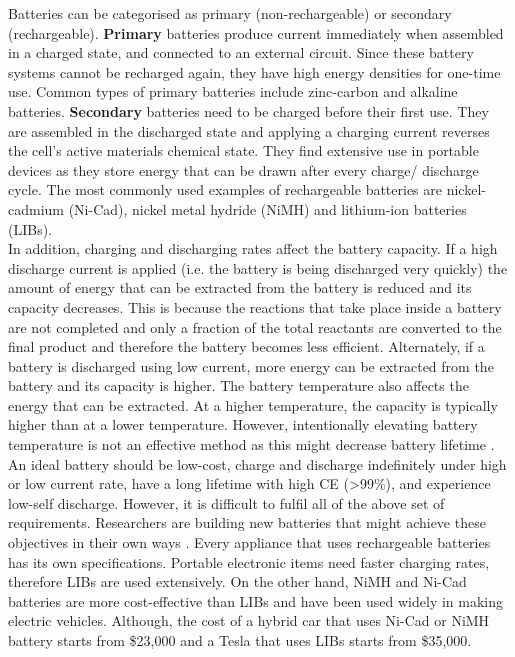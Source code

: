 Batteries can be categorised as primary (non-rechargeable) or secondary (rechargeable). \textbf{Primary} batteries produce current immediately when assembled in a charged state, and connected to an external circuit. Since these battery systems cannot be recharged again, they have high energy densities for one-time use. Common types of primary batteries include zinc-carbon and alkaline batteries. 
\textbf{Secondary} batteries need to be charged before their first use. They are assembled in the discharged state and applying a charging current reverses the cell's active materials chemical state. They find extensive use in portable devices as they store energy that can be drawn after every charge/ discharge cycle. The most commonly used examples of rechargeable batteries are nickel-cadmium (Ni-Cad), nickel metal hydride (NiMH) and lithium-ion batteries (LIBs). \\  
In addition, charging and discharging rates affect the battery capacity. If a high discharge current is applied (i.e. the battery is being discharged very quickly) the amount of energy that can be extracted from the battery is reduced and its capacity decreases. This is because the reactions that take place inside a battery are not completed and only a fraction of the total reactants are converted to the final product and therefore the battery becomes less efficient. Alternately, if a battery is discharged using low current, more energy can be extracted from the battery and its capacity is higher. The battery temperature also affects the energy that can be extracted. At a higher temperature, the capacity is typically higher than at a lower temperature. However, intentionally elevating battery temperature is not an effective method as this might decrease battery lifetime \cite{leng_effect_2015, ma_temperature_2018}. 
An ideal battery should be low-cost, charge and discharge indefinitely under high or low current rate, have a long lifetime with high CE (>99\%), and experience low-self discharge. However, it is difficult to fulfil all of the above set of requirements. Researchers are building new batteries that might achieve these objectives in their own ways \cite{slater_sodium-ion_2013, jian_carbon_2015, aurbach_prototype_2000, lin_ultrafast_2015}. Every appliance that uses rechargeable batteries has its own specifications. Portable electronic items need faster charging rates, therefore LIBs are used extensively. On the other hand, NiMH and Ni-Cad batteries are more cost-effective than LIBs and have been used widely in making electric vehicles. Although, the cost of a hybrid car that uses Ni-Cad or NiMH battery starts from \$23,000 and a Tesla that uses LIBs starts from \$35,000. \\

